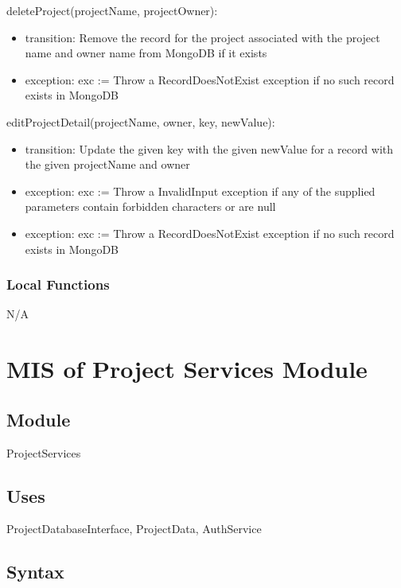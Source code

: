 \documentclass[12pt, titlepage]{article}
\begin{document}
	\noindent deleteProject(projectName, projectOwner):
	\begin{itemize}
		\item transition: Remove the record for the project associated with the project name and owner name from MongoDB if it exists
		
		\item exception: exc := Throw a RecordDoesNotExist exception if no such record exists in MongoDB
	\end{itemize}
	
	\noindent editProjectDetail(projectName, owner, key, newValue):
	\begin{itemize}
		\item transition: Update the given key with the given newValue for a record with the given projectName and owner
		
		\item exception: exc := Throw a InvalidInput exception if any of the supplied parameters contain forbidden characters or are null
		\item exception: exc := Throw a RecordDoesNotExist exception if no such record exists in MongoDB
	\end{itemize}
	
	\subsubsection{Local Functions}
	
	N/A
	
	\newpage
	
	\section{MIS of Project Services Module} \label{Module} 
	
	\subsection{Module}
	
	ProjectServices
	
	\subsection{Uses}
	ProjectDatabaseInterface, ProjectData, AuthService
	
	\subsection{Syntax}
	
\end{document}
